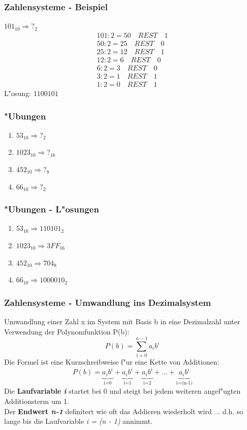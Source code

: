 \documentclass{beamer}
\begin{document}
\frame
{
	\frametitle{Zahlensysteme - Beispiel}
	$101_{10} \Rightarrow ?_2$\\
	\vspace{3mm}
	\begin{displaymath}
	\begin{array}{ll}
	101 : 2 = 50 \quad REST \quad 1 \\
	50 : 2 = 25 \quad REST \quad 0 \\
	25 : 2 = 12 \quad REST \quad 1 \\
	12 : 2 = 6 \quad REST \quad 0 \\
	6: 2 = 3 \quad REST \quad 0 \\
	3 : 2 = 1 \quad REST \quad 1 \\
	1 : 2 = 0 \quad REST \quad 1
	\end{array}
	\end{displaymath}
	\vspace{3mm}
	L"osung: $1100101$
}

\frame
{
	\frametitle{"Ubungen}
	\begin{enumerate}
	\item $53_{10} \Rightarrow ?_2$
	\item $1023_{10} \Rightarrow ?_{16}$
	\item $452_{10} \Rightarrow ?_8$
	\item $66_{10} \Rightarrow ?_2$
	\end{enumerate}
}

\frame
{
	\frametitle{"Ubungen - L"osungen}
	\begin{enumerate}
	\item $53_{10} \Rightarrow 110101_2$
	\item $1023_{10} \Rightarrow 3FF_{16}$
	\item $452_{10} \Rightarrow 704_8$
	\item $66_{10} \Rightarrow 1000010_2$
	\end{enumerate}
}

\frame 
{
	\frametitle{Zahlensysteme - Umwandlung ins Dezimalsystem}
	Umwandlung einer Zahl x im System mit Basis b in eine Dezimalzahl unter Verwendung der Polynomfunktion P(b):
	\begin{displaymath}
	P(b) = \sum_{\mathrm{i}=0}^{n-1} a_\mathit{i} b^\mathit{i}
	\end{displaymath}		
	Die Formel ist eine Kurzschreibweise f"ur eine Kette von Additionen:
	\begin{displaymath}
	P(b)= \underbrace{a_i b^i}_\text{i=0} + \underbrace{a_i b^i}_\text{i=1} + \underbrace{a_i b^i}_\text{i=2} + \dots + \underbrace{a_i b^i}_\text{i=(n-1)}
	\end{displaymath}	
	Die \textbf{Laufvariable \textit{i}} startet bei 0 und steigt bei jedem weiteren angef"ugten Additionsterm um 1.	\\
	Der \textbf{Endwert \textit{n-1}} definitert wie oft das Addieren wiederholt wird ... d.h. so lange bis die Laufvariable \textit{i = (n - 1)} annimmt.
}
\end{document}
